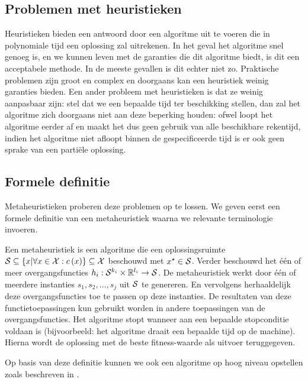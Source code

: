 \subsection{Problemen met heuristieken}

Heuristieken bieden een antwoord door een algoritme uit te voeren die in polynomiale tijd een oplossing zal uitrekenen. In het geval het algoritme snel genoeg is, en we kunnen leven met de garanties die dit algoritme biedt, is dit een acceptabele methode. In de meeste gevallen is dit echter niet zo. Praktische problemen zijn groot en complex en doorgaans kan een heuristiek weinig garanties bieden. Een ander probleem met heuristieken is dat ze weinig aanpasbaar zijn: stel dat we een bepaalde tijd ter beschikking stellen, dan zal het algoritme zich doorgaans niet aan deze beperking houden: ofwel loopt het algoritme eerder af en maakt het dus geen gebruik van alle beschikbare rekentijd, indien het algoritme niet afloopt binnen de gespecificeerde tijd is er ook geen sprake van een parti\"ele oplossing.

\subsection{Formele definitie}

Metaheuristieken proberen deze problemen op te lossen. We geven eerst een formele definitie van een metaheuristiek waarna we relevante terminologie invoeren.

\begin{definition}[Metaheuristiek]
Een metaheuristiek is een algoritme die een oplossingsruimte $\mathcal{S}\subseteq\left\{ x|\forall x\in \mathcal{X}:c\left(x\right)\right\}\subseteq\mathcal{X}$ beschouwd met $x^{\star}\in\mathcal{S}$. Verder beschouwd het \'e\'en of meer overgangsfuncties $h_i:\mathcal{S}^{k_i}\times\mathbb{R}^{l_i}\rightarrow\mathcal{S}$. De metaheuristiek werkt door \'e\'en of meerdere instanties $s_1,s_2,\ldots,s_j$ uit $\mathcal{S}$ te genereren. En vervolgens herhaaldelijk deze overgangsfuncties toe te passen op deze instanties. De resultaten van deze functietoepassingen kun gebruikt worden in andere toepassingen van de overgangsfuncties. Het algoritme stopt wanneer aan een bepaalde stopconditie voldaan is (bijvoorbeeld: het algoritme draait een bepaalde tijd op de machine). Hierna wordt de oplossing met de beste fitness-waarde als uitvoer teruggegeven.
\end{definition}

Op basis van deze definitie kunnen we ook een algoritme op hoog niveau opstellen zoals beschreven in .

